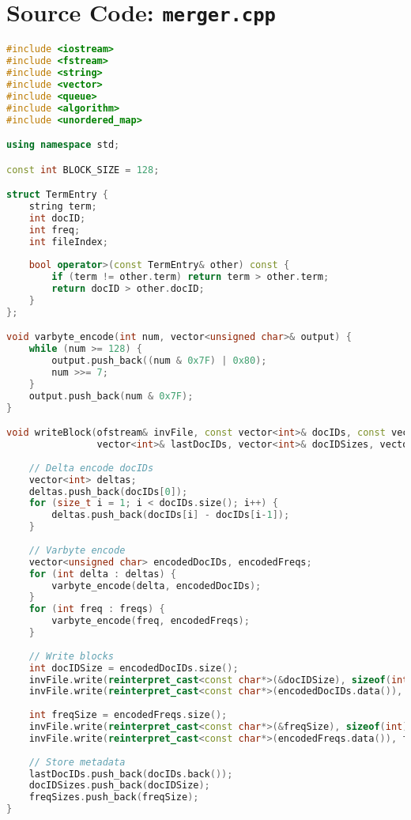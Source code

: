 \documentclass[11pt, a4paper]{report}
\begin{document}
\section{Source Code: \texttt{merger.cpp}}
\begin{lstlisting}[language=C++, caption={The complete source code for the merger component.}, label={lst:merger}]
#include <iostream>
#include <fstream>
#include <string>
#include <vector>
#include <queue>
#include <algorithm>
#include <unordered_map>

using namespace std;

const int BLOCK_SIZE = 128;

struct TermEntry {
    string term;
    int docID;
    int freq;
    int fileIndex;
    
    bool operator>(const TermEntry& other) const {
        if (term != other.term) return term > other.term;
        return docID > other.docID;
    }
};

void varbyte_encode(int num, vector<unsigned char>& output) {
    while (num >= 128) {
        output.push_back((num & 0x7F) | 0x80);
        num >>= 7;
    }
    output.push_back(num & 0x7F);
}

void writeBlock(ofstream& invFile, const vector<int>& docIDs, const vector<int>& freqs,
                vector<int>& lastDocIDs, vector<int>& docIDSizes, vector<int>& freqSizes) {
    
    // Delta encode docIDs
    vector<int> deltas;
    deltas.push_back(docIDs[0]);
    for (size_t i = 1; i < docIDs.size(); i++) {
        deltas.push_back(docIDs[i] - docIDs[i-1]);
    }
    
    // Varbyte encode
    vector<unsigned char> encodedDocIDs, encodedFreqs;
    for (int delta : deltas) {
        varbyte_encode(delta, encodedDocIDs);
    }
    for (int freq : freqs) {
        varbyte_encode(freq, encodedFreqs);
    }
    
    // Write blocks
    int docIDSize = encodedDocIDs.size();
    invFile.write(reinterpret_cast<const char*>(&docIDSize), sizeof(int));
    invFile.write(reinterpret_cast<const char*>(encodedDocIDs.data()), docIDSize);
    
    int freqSize = encodedFreqs.size();
    invFile.write(reinterpret_cast<const char*>(&freqSize), sizeof(int));
    invFile.write(reinterpret_cast<const char*>(encodedFreqs.data()), freqSize);
    
    // Store metadata
    lastDocIDs.push_back(docIDs.back());
    docIDSizes.push_back(docIDSize);
    freqSizes.push_back(freqSize);
}


\end{lstlisting}
\end{document}
